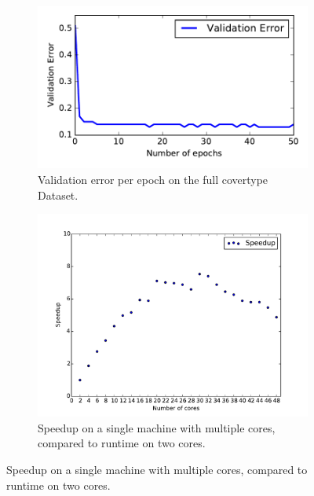 \documentclass{article} %
\begin{document}
\begin{figure}[!ht]
	\begin{subfigure}[b]{0.4\textwidth}
		\centering
		\includegraphics[width=\textwidth]{imgs/covertype_validation.pdf}
		\caption{Validation error per epoch on the full covertype Dataset.}
		\label{fig:covertype_validation}
	\end{subfigure}
  \hfill
	\begin{subfigure}[b]{0.4\textwidth}
		\centering
		\includegraphics[width=\textwidth]{imgs/speedup_58.pdf}
		\caption{Speedup on a single machine with multiple cores, compared to runtime on two cores.}
		\label{fig:speedup_58}
	\end{subfigure}
\end{figure}
\end{document}
